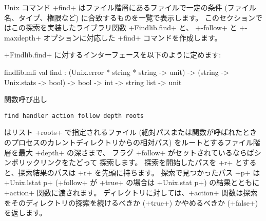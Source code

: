 Unix コマンド \ml+find+ はファイル階層にあるファイルで一定の条件 (ファイル名、タイプ、権限など)
に合致するものを一覧で表示します。
このセクションではこの探索を実装したライブラリ関数 \ml+Findlib.find+ と、
\ml+-follow+ と \ml+-maxdepth+ オプションに対応した \ml+find+ コマンドを作成します。

\ml+Findlib.find+ に対するインターフェースを以下のように定めます:
%
\begin{listingcodefile}{findlib.mli}
val find :
  (Unix.error * string * string -> unit) ->
  (string -> Unix.stats -> bool) -> bool -> int -> string list ->
  unit
\end{listingcodefile}
%
関数呼び出し
\begin{lstlisting}
find handler action follow depth roots
\end{lstlisting}
はリスト \ml+roots+ で指定されるファイル (絶対パスまたは関数が呼ばれたときのプロセスのカレントディレクトリからの相対パス)
をルートとするファイル階層を最大 \ml+depth+ の深さまで、 フラグ \ml+follow+ がセットされているならばシンボリックリンクをたどって
探索します。 探索を開始したパスを \ml+r+ とすると、探索結果のパスは \ml+r+ を先頭に持ちます。
探索で見つかったパス \ml+p+ は \ml+Unix.lstat p+
(\ml+follow+ が \ml+true+ の場合は \ml+Unix.stat p+) の結果とともに
\ml+action+ 関数に渡されます。
ディレクトリに対しては、\ml+action+ 関数は探索をそのディレクトリの探索を続けるべきか
(\ml+true+) かやめるべきか (\ml+false+) を返します。

